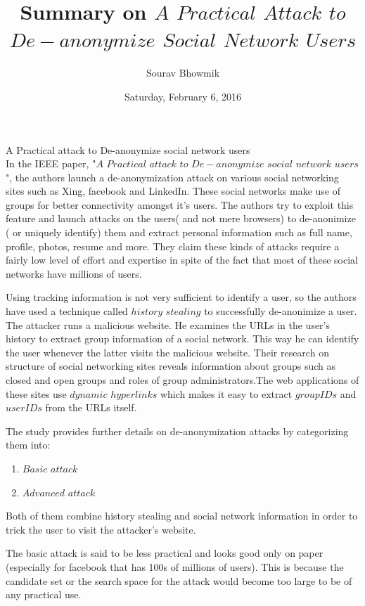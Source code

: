 \documentclass{article}
\title{Summary on
 $A$ $Practical$ $Attack$ $to$ $De-anonymize$ $Social$ $Network$ $Users$ }
\author{Sourav Bhowmik}
\date{Saturday, February 6, 2016}
\begin{document}
		\maketitle
		A Practical attack to De-anonymize social network users\\

		In the IEEE paper, "$A$ $Practical$ $attack$ $to$ $De-anonymize$ $social$ $network$ $users$", the authors launch a de-anonymization attack on various social networking sites such as Xing, facebook and LinkedIn. These social networks make use of groups for better connectivity amongst it's users. The authors try to exploit this feature and launch attacks on the users( and not mere browsers) to de-anonimize ( or uniquely identify) them and extract personal information such as full name, profile, photos, resume and more. They claim these kinds of attacks require a fairly low level of effort and expertise in spite of the fact that most of these social networks have millions of users.

Using tracking information is not very sufficient to identify a user, so the authors have used a technique called $history$ $stealing$ to successfully de-anonimize a user. The attacker runs a malicious website. He examines the URLs in the user's history to extract group information of a social network. This way he can identify the user whenever the latter visits the malicious website. Their research on structure of social networking sites reveals information about groups such as closed and open groups and roles of group administrators.The web applications of these sites use $dynamic$ $hyperlinks$ which makes it easy to extract $groupIDs$ and $userIDs$ from the URLs itself.

The study provides further details on de-anonymization attacks by categorizing them into:


\begin{enumerate}
  \item $Basic$ $attack$
  \item $Advanced$ $attack$
\end{enumerate}

Both of them combine history stealing and social network information in order to trick the user to visit the attacker's website.

The basic attack is said to be less practical and looks good only on paper (especially for facebook that has 100s of millions of users). This is because the candidate set or the search space for the attack would become too large to be of any practical use.
\end{document}
